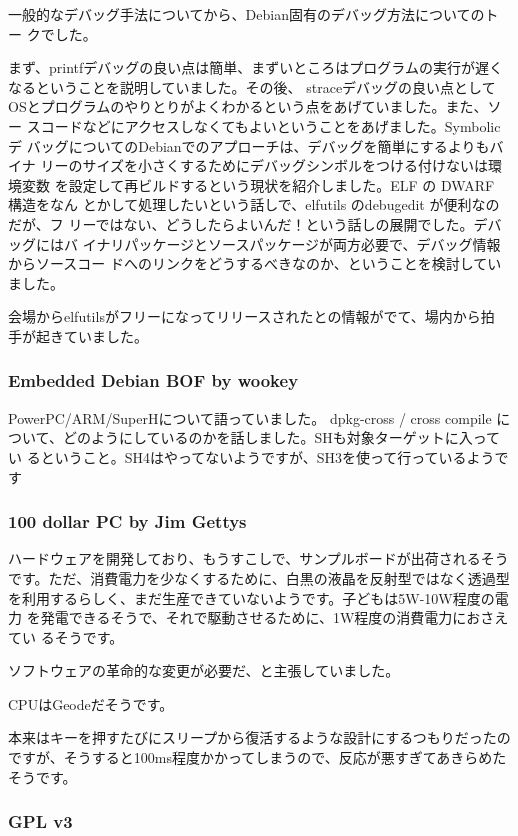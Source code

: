 \documentclass[mingoth,a4paper]{jsarticle}
\begin{document}
 一般的なデバッグ手法についてから、Debian固有のデバッグ方法についてのトー
 クでした。

まず、printfデバッグの良い点は簡単、まずいところはプログラムの実行が遅く
なるということを説明していました。その後、 straceデバッグの良い点として
OSとプログラムのやりとりがよくわかるという点をあげていました。また、ソー
スコードなどにアクセスしなくてもよいということをあげました。Symbolic デ
バッグについてのDebianでのアプローチは、デバッグを簡単にするよりもバイナ
リーのサイズを小さくするためにデバッグシンボルをつける付けないは環境変数
を設定して再ビルドするという現状を紹介しました。ELF の DWARF 構造をなん
とかして処理したいという話しで、elfutils のdebugedit が便利なのだが、フ
リーではない、どうしたらよいんだ！という話しの展開でした。デバッグにはバ
イナリパッケージとソースパッケージが両方必要で、デバッグ情報からソースコー
ドへのリンクをどうするべきなのか、ということを検討していました。

会場からelfutilsがフリーになってリリースされたとの情報がでて、場内から拍
手が起きていました。

\subsubsection{Embedded Debian BOF by wookey}

PowerPC/ARM/SuperHについて語っていました。 dpkg-cross / cross compile に
ついて、どのようにしているのかを話しました。SHも対象ターゲットに入ってい
るということ。SH4はやってないようですが、SH3を使って行っているようです

\subsubsection{100 dollar PC by Jim Gettys}

ハードウェアを開発しており、もうすこしで、サンプルボードが出荷されるそう
です。ただ、消費電力を少なくするために、白黒の液晶を反射型ではなく透過型
を利用するらしく、まだ生産できていないようです。子どもは5W-10W程度の電力
を発電できるそうで、それで駆動させるために、1W程度の消費電力におさえてい
るそうです。

ソフトウェアの革命的な変更が必要だ、と主張していました。

CPUはGeodeだそうです。

本来はキーを押すたびにスリープから復活するような設計にするつもりだったの
ですが、そうすると100ms程度かかってしまうので、反応が悪すぎてあきらめたそうです。


\subsubsection{GPL v3}
\end{document}
